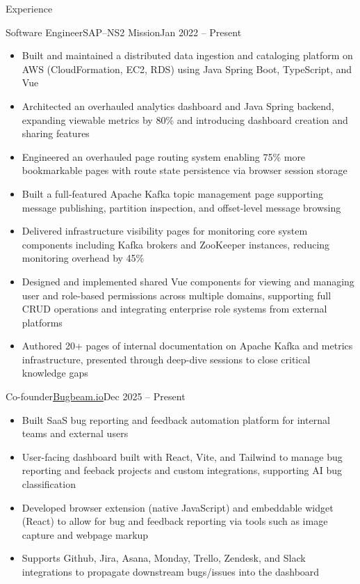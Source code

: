 \documentclass[]{mcdowellcv}
\begin{document}
	\makeheader
	
	\begin{cvsection}{Experience}
		\begin{cvsubsection}{Software Engineer}{SAP--NS2 Mission}{Jan 2022 -- Present}	
			\begin{itemize}
                \item Built and maintained a distributed data ingestion and cataloging platform on AWS (CloudFormation, EC2, RDS) using Java Spring Boot, TypeScript, and Vue
                \item Architected an overhauled analytics dashboard and Java Spring backend, expanding viewable metrics by 80\% and introducing dashboard creation and sharing features
                \item Engineered an overhauled page routing system enabling 75\% more bookmarkable pages with route state persistence via browser session storage
                \item Built a full-featured Apache Kafka topic management page supporting message publishing, partition inspection, and offset-level message browsing
                \item Delivered infrastructure visibility pages for monitoring core system components including Kafka brokers and ZooKeeper instances, reducing monitoring overhead by 45\%
                \item Designed and implemented shared Vue components for viewing and managing user and role-based permissions across multiple domains, supporting full CRUD operations and integrating enterprise role systems from external platforms
                \item Authored 20+ pages of internal documentation on Apache Kafka and metrics infrastructure, presented through deep-dive sessions to close critical knowledge gaps
			\end{itemize}
		\end{cvsubsection}

        \begin{cvsubsection}{Co-founder}{\underline{\href{https://bugbeam.io}{Bugbeam.io}}}{Dec 2025 -- Present}	
			\begin{itemize}
                \item Built SaaS bug reporting and feedback automation platform for internal teams and external users
                \item User-facing dashboard built with React, Vite, and Tailwind to manage bug reporting and feeback projects and custom integrations, supporting AI bug classification  
                \item Developed browser extension (native JavaScript) and embeddable widget (React) to allow for bug and feedback reporting via tools such as image capture and webpage markup
                \item Supports Github, Jira, Asana, Monday, Trello, Zendesk, and Slack integrations to propagate downstream bugs/issues into the dashboard
			\end{itemize}
		\end{cvsubsection}


\end{cvsection}
\end{document}

